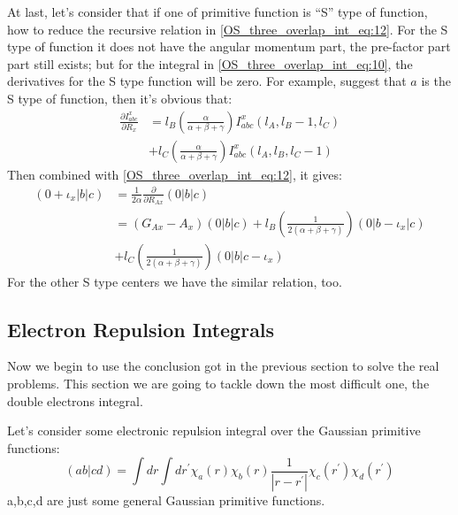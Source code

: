 At last, let's consider that if one of primitive function is ``S'' type of 
function, how to reduce the recursive relation in
\ref{OS_three_overlap_int_eq:12}. For the S type of function it does not have
the angular momentum part, the pre-factor part part still exists; but for the
integral in \ref{OS_three_overlap_int_eq:10}, the derivatives for the S type 
function will be zero. For example, suggest that $a$ is the S type of function,
then it's obvious that:
\begin{equation}
\begin{split}
 \frac{\partial I^{x}_{abc}}{\partial R_{x}} &= 
l_{B}\left(
\frac{\alpha}{\alpha+\beta+\gamma}\right)I^{x}_{abc}(l_{A},l_{B}-1,l_{C}) \\
&+ l_{C}\left(
\frac{\alpha}{\alpha+\beta+\gamma}\right)I^{x}_{abc}(l_{A},l_{B},l_{C}-1) 
\end{split}
 \label{OS_three_overlap_int_eq:13}
\end{equation}
Then combined with \ref{OS_three_overlap_int_eq:12}, it gives:
\begin{equation}
 \begin{split}
 (0+\iota_{x}|b|c) &= \frac{1}{2\alpha}\frac{\partial }{\partial R_{Ax}}(0|b|c) 
\\
&= (G_{Ax} - A_{x})(0|b|c) 
+ l_{B}\left(\frac{1}{2(\alpha+\beta+\gamma)}\right)(0|b-\iota_{x}|c) \\ 
&+ l_{C}\left(\frac{1}{2(\alpha+\beta+\gamma)}\right)(0|b|c-\iota_{x}) 
 \end{split}
\label{OS_three_overlap_int_eq:14}
\end{equation}
For the other S type centers we have the similar relation, too. 
\subsection{Electron Repulsion Integrals}
%
%
%
%
Now we begin to use the conclusion got in the previous section to solve the
real problems. This section we are going to tackle down the most difficult one,
the double electrons integral.

Let's consider some electronic repulsion integral over the
Gaussian primitive functions:
\begin{equation}
 \label{OS_ERI_eq:1}
(ab|cd) = \int dr \int dr^{'} \chi_{a}(r)\chi_{b}(r)\frac{1}{|r-r^{'}|}
\chi_{c}(r^{'})\chi_{d}(r^{'})
\end{equation}
a,b,c,d are just some general Gaussian primitive functions.

